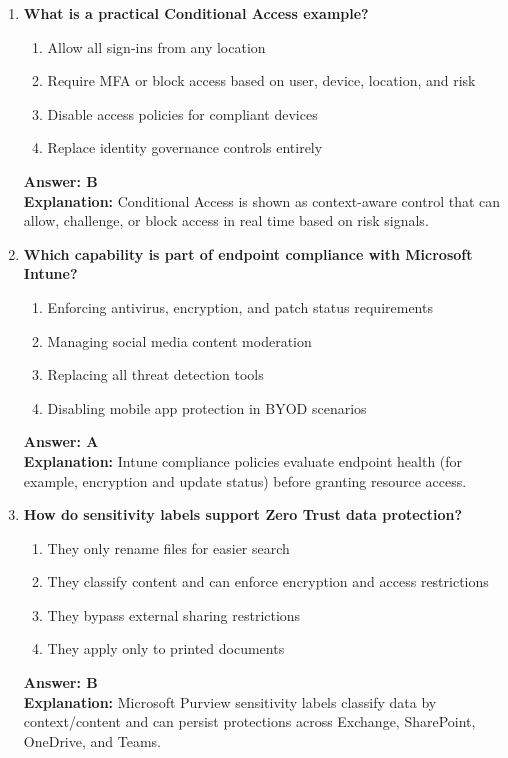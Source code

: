 \documentclass[10pt]{article}
\begin{document}
\begin{enumerate}[leftmargin=*]
\item \textbf{What is a practical Conditional Access example?}
\begin{enumerate}[label=\Alph*.]
  \item Allow all sign-ins from any location
  \item Require MFA or block access based on user, device, location, and risk
  \item Disable access policies for compliant devices
  \item Replace identity governance controls entirely
\end{enumerate}
\textbf{Answer: B}\\
\textbf{Explanation:} Conditional Access is shown as context-aware control that can allow, challenge, or block access in real time based on risk signals.

\item \textbf{Which capability is part of endpoint compliance with Microsoft Intune?}
\begin{enumerate}[label=\Alph*.]
  \item Enforcing antivirus, encryption, and patch status requirements
  \item Managing social media content moderation
  \item Replacing all threat detection tools
  \item Disabling mobile app protection in BYOD scenarios
\end{enumerate}
\textbf{Answer: A}\\
\textbf{Explanation:} Intune compliance policies evaluate endpoint health (for example, encryption and update status) before granting resource access.

\item \textbf{How do sensitivity labels support Zero Trust data protection?}
\begin{enumerate}[label=\Alph*.]
  \item They only rename files for easier search
  \item They classify content and can enforce encryption and access restrictions
  \item They bypass external sharing restrictions
  \item They apply only to printed documents
\end{enumerate}
\textbf{Answer: B}\\
\textbf{Explanation:} Microsoft Purview sensitivity labels classify data by context/content and can persist protections across Exchange, SharePoint, OneDrive, and Teams.


\end{enumerate}
\end{document}

